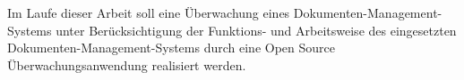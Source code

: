 Im Laufe dieser Arbeit soll eine Überwachung eines Dokumenten-Management-Systems unter Berücksichtigung der Funktions- und Arbeitsweise des eingesetzten Dokumenten-Management-Systems durch eine Open Source Überwachungsanwendung realisiert werden.
 

